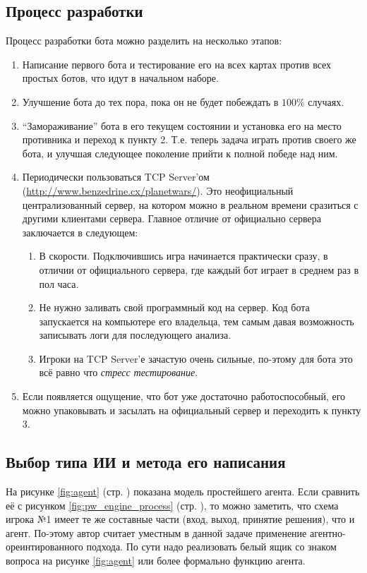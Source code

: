 \documentclass[12pt]{report}
\newenvironment{myEnumerate}{
	\begin{enumerate}
  		\setlength{\itemsep}{1pt}
  		\setlength{\parskip}{0pt}
  		\setlength{\parsep}{0pt}
}{\end{enumerate}}
\begin{document}
\subsection{Процесс разработки}
Процесс разработки бота можно разделить на несколько этапов:
\begin{myEnumerate}
\item Написание первого бота и тестирование его на всех картах против всех простых ботов, что идут в начальном наборе.
\item Улучшение бота до тех пора, пока он не будет побеждать в $100\%$ случаях.
\item ``Замораживание'' бота в его текущем состоянии и установка его на место противника и переход к пункту 2. Т.е. теперь задача играть против своего же бота, и улучшая следующее поколение прийти к полной победе над ним.
\item Периодически пользоваться TCP Server'ом (\url{http://www.benzedrine.cx/planetwars/}). Это неофициальный централизованный сервер, на котором можно в реальном времени сразиться с другими клиентами сервера. Главное отличие от официально сервера заключается в следующем:
	\begin{myEnumerate} 
	\item В скорости. Подключившись игра начинается практически сразу, в отличии от официального сервера, где каждый бот играет в среднем раз в пол часа.
	\item Не нужно заливать свой программный код на сервер. Код бота запускается на компьютере его владельца, тем самым давая возможность записывать логи для последующего анализа.
	\item Игроки на TCP Server'е зачастую очень сильные, по-этому для бота это всё равно что \emph{стресс тестирование}.
	\end{myEnumerate}
\item Если появляется ощущение, что бот уже достаточно работоспособный, его можно упаковывать и засылать на официальный сервер и переходить к пункту 3.
\end{myEnumerate}



\subsection{Выбор типа ИИ и метода его написания}
На рисунке \ref{fig:agent} (стр. \pageref{fig:agent}) показана модель простейшего агента. Если сравнить её с рисунком \ref{fig:pw_engine_process} (стр. \pageref{fig:pw_engine_process}), то можно заметить, что схема игрока №1 имеет те же составные  части (вход, выход, принятие решения), что и агент. По-этому автор считает уместным в данной задаче применение агентно-ореинтированного подхода. По сути надо реализовать белый ящик со знаком вопроса на рисунке \ref{fig:agent} или более формально функцию агента.
\end{document}
